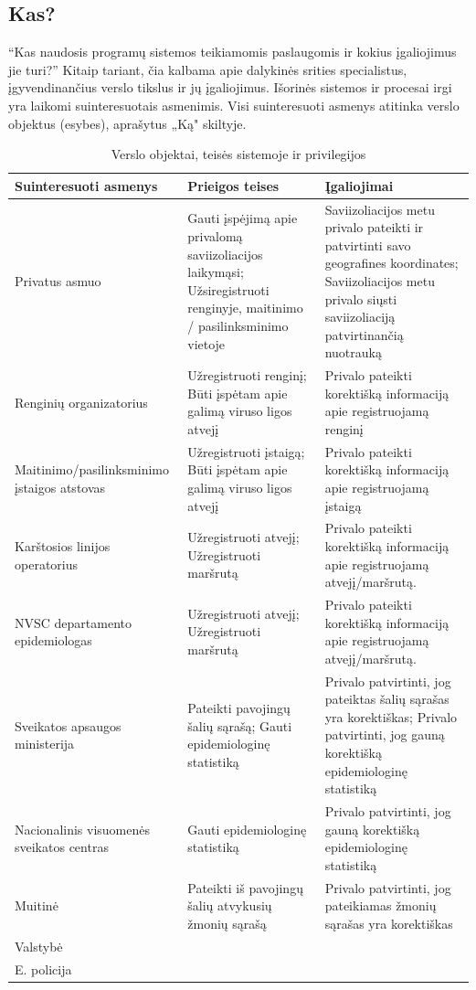 \documentclass{VUMIFPSkursinis}
\begin{document}
\subsection{Kas?}
 “Kas naudosis programų sistemos
teikiamomis paslaugomis ir kokius įgaliojimus jie turi?” Kitaip tariant, čia kalbama apie
dalykinės srities specialistus, įgyvendinančius verslo tikslus ir jų įgaliojimus. Išorinės sistemos ir procesai irgi yra laikomi suinteresuotais asmenimis. Visi suinteresuoti asmenys atitinka verslo objektus (esybes), aprašytus „Ką" skiltyje.
\begin{center}
	\small
	\begin{longtable}{|L{3cm}|C{5cm}|C{7cm}|}
		\caption{Verslo objektai, teisės sistemoje ir privilegijos}
		\label{table:EmployeeSalary}
		\\ \hline
		Suinteresuoti asmenys &
		Prieigos teises   &										
		Įgaliojimai \\ \hline
		Privatus asmuo &
		Gauti įspėjimą apie privalomą saviizoliacijos laikymąsi; Užsiregistruoti renginyje, maitinimo / pasilinksminimo vietoje&
		Saviizoliacijos metu privalo pateikti ir patvirtinti savo geografines koordinates; Saviizoliacijos metu privalo siųsti saviizoliaciją patvirtinančią nuotrauką\\ \hline
		Renginių organizatorius &
		Užregistruoti renginį; Būti įspėtam apie galimą viruso ligos atvejį&
		Privalo pateikti korektišką informaciją apie registruojamą renginį\\ \hline		
		Maitinimo/pasilinksminimo įstaigos atstovas &
		Užregistruoti įstaigą; Būti įspėtam apie galimą viruso ligos atvejį&
		Privalo pateikti korektišką informaciją apie registruojamą įstaigą\\ \hline	
		Karštosios linijos operatorius &
		Užregistruoti atvejį; Užregistruoti maršrutą&
		Privalo pateikti korektišką informaciją apie registruojamą atvejį/maršrutą.\\ \hline	
		NVSC departamento epidemiologas &
		Užregistruoti atvejį; Užregistruoti maršrutą&
		Privalo pateikti korektišką informaciją apie registruojamą atvejį/maršrutą.\\ \hline	
		Sveikatos apsaugos ministerija &
		Pateikti pavojingų šalių sąrašą; Gauti epidemiologinę statistiką&
		Privalo patvirtinti, jog pateiktas šalių sąrašas yra korektiškas; Privalo patvirtinti, jog gauną korektišką epidemiologinę statistiką\\ \hline	
		Nacionalinis visuomenės sveikatos centras &
		Gauti epidemiologinę statistiką&
		Privalo patvirtinti, jog gauną korektišką epidemiologinę statistiką\\ \hline	
		Muitinė &
		Pateikti iš pavojingų šalių atvykusių žmonių sąrašą&
		Privalo patvirtinti, jog pateikiamas žmonių sąrašas yra korektiškas\\ \hline	
		Valstybė &
		&
		\\ \hline	
		E. policija &
		&
		\\ \hline																	
\end{longtable}
\end{center}
\end{document}
